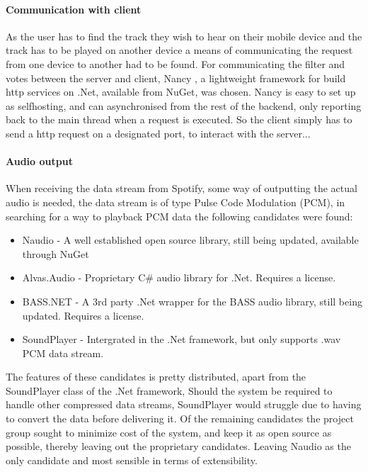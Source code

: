 	\paragraph{Communication with client}
	As the user has to find the track they wish to hear on their mobile device and the track has to be played on another device a means of communicating the request from one device to another had to be found.
	For communicating the filter and votes between the server and client, Nancy \cite{nancy}, a lightweight framework for build http services on .Net, available from NuGet, was chosen. Nancy is easy to set up as selfhosting, and can asynchronised from the rest of the backend, only reporting back to the main thread when a request is executed. So the client simply has to send a http request on a designated port, to interact with the server...  

	\paragraph{Audio output}
	When receiving the data stream from Spotify, some way of outputting the actual audio is needed, the data stream is of type Pulse Code Modulation (PCM), in searching for a way to playback PCM data the following candidates were found:

\begin{itemize}
	\item Naudio \cite{naudio} - A well established open source library, still being updated, available through NuGet
	\item Alvas.Audio \cite{alvas} - Proprietary C\# audio library for .Net. Requires a license.
	\item BASS.NET \cite{bass} - A 3rd party .Net wrapper for the BASS audio library, still being updated. Requires a license.
	\item SoundPlayer - Intergrated in the .Net framework, but only supports .wav PCM data stream.
\end{itemize}

	The features of these candidates is pretty distributed, apart from the SoundPlayer class of the .Net framework, Should the system be required to handle other compressed data streams, SoundPlayer would struggle due to having to convert the data before delivering it. Of the remaining candidates the project group sought to minimize cost of the system, and keep it as open source as possible, thereby leaving out the proprietary candidates. Leaving Naudio as the only candidate and most sensible in terms of extensibility.